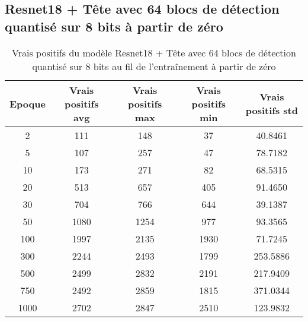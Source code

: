 
\clearpage
\subsection{Resnet18 + Tête avec 64 blocs de détection quantisé sur 8 bits à partir de zéro}
\label{appendix:qresnet18_8b_fs}

\begin{table}[!ht]
    \caption{Vrais positifs du modèle Resnet18 + Tête avec 64 blocs de détection quantisé sur 8 bits au fil de l'entraînement à partir de zéro}
    \label{tab:qresnet18+head_64n_true_positive_8b_from_scratch}
    \centering
    \begin{tabular}{ |c||c|c|c|c|  }
        \hline
        \rowcolor{gray!50}
        Epoque & Vrais positifs avg & Vrais positifs max & Vrais positifs min & Vrais positifs std\\
        \hline
        2 & 111 & 148 & 37 & 40.8461\\
        5 & 107 & 257 & 47 & 78.7182\\
        10 & 173 & 271 & 82 & 68.5315\\
        20 & 513 & 657 & 405 & 91.4650\\
        30 & 704 & 766 & 644 & 39.1387\\
        50 & 1080 & 1254 & 977 & 93.3565\\
        100 & 1997 & 2135 & 1930 & 71.7245\\
        300 & 2244 & 2493 & 1799 & 253.5886\\
        500 & 2499 & 2832 & 2191 & 217.9409\\
        750 & 2492 & 2859 & 1815 & 371.0344\\
        1000 & 2702 & 2847 & 2510 & 123.9832\\
        \hline
    \end{tabular}
\end{table}

